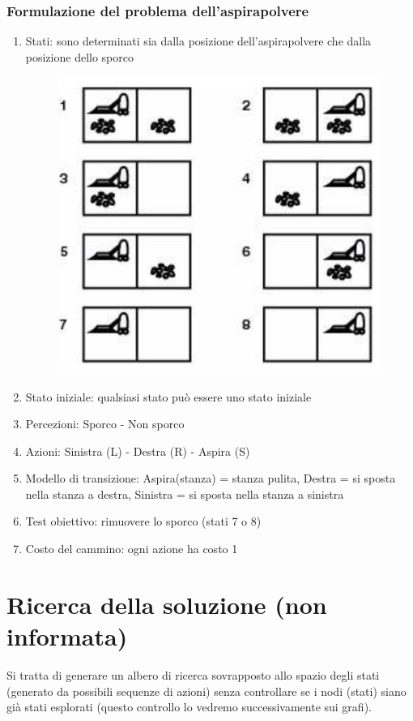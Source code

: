\documentclass{article}
\begin{document}
\subsubsection{Formulazione del problema dell'aspirapolvere}
\begin{enumerate}
    \item Stati: sono determinati sia dalla posizione dell'aspirapolvere che dalla posizione dello sporco
        \begin{figure}[H]
            \centering
            \includegraphics[scale=0.2]{Images/statiaspirapolvere.png}
        \end{figure}
    \item Stato iniziale: qualsiasi stato può essere uno stato iniziale
    \item Percezioni: Sporco - Non sporco
    \item Azioni: Sinistra (L) - Destra (R) - Aspira (S)
    \item Modello di transizione: Aspira(stanza) = stanza pulita, Destra = si sposta nella stanza a destra, Sinistra = si sposta nella stanza a sinistra
    \item Test obiettivo: rimuovere lo sporco (stati 7 o 8)
    \item Costo del cammino: ogni azione ha costo 1
\end{enumerate}

\section{Ricerca della soluzione (non informata)}
Si tratta di generare un albero di ricerca sovrapposto allo spazio degli stati (generato da possibili sequenze di azioni) senza controllare se i nodi (stati) siano già stati esplorati (questo controllo lo vedremo successivamente sui grafi).
\end{document}
